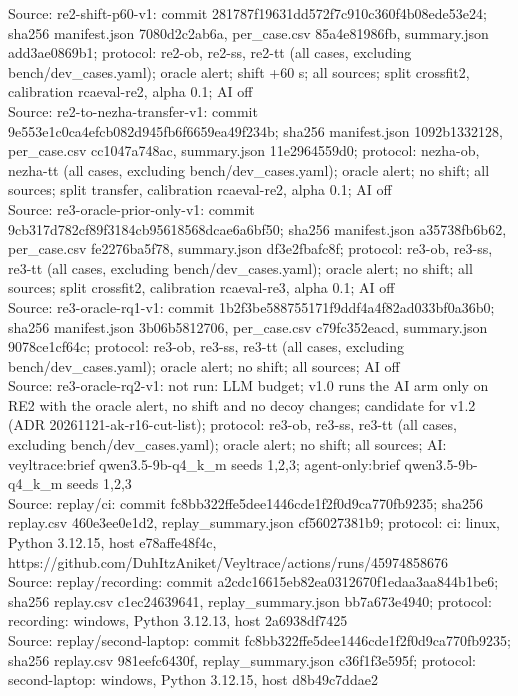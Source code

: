 \begin{table}[t]
Source: re2-shift-p60-v1: commit 281787f19631dd572f7c910c360f4b08ede53e24; sha256 manifest.json 7080d2c2ab6a, per\_case.csv 85a4e81986fb, summary.json add3ae0869b1; protocol: re2-ob, re2-ss, re2-tt (all cases, excluding bench/dev\_cases.yaml); oracle alert; shift +60 s; all sources; split crossfit2, calibration rcaeval-re2, alpha 0.1; AI off\\
Source: re2-to-nezha-transfer-v1: commit 9e553e1c0ca4efcb082d945fb6f6659ea49f234b; sha256 manifest.json 1092b1332128, per\_case.csv cc1047a748ac, summary.json 11e2964559d0; protocol: nezha-ob, nezha-tt (all cases, excluding bench/dev\_cases.yaml); oracle alert; no shift; all sources; split transfer, calibration rcaeval-re2, alpha 0.1; AI off\\
Source: re3-oracle-prior-only-v1: commit 9cb317d782cf89f3184cb95618568dcae6a6bf50; sha256 manifest.json a35738fb6b62, per\_case.csv fe2276ba5f78, summary.json df3e2fbafc8f; protocol: re3-ob, re3-ss, re3-tt (all cases, excluding bench/dev\_cases.yaml); oracle alert; no shift; all sources; split crossfit2, calibration rcaeval-re3, alpha 0.1; AI off\\
Source: re3-oracle-rq1-v1: commit 1b2f3be588755171f9ddf4a4f82ad033bf0a36b0; sha256 manifest.json 3b06b5812706, per\_case.csv c79fc352eacd, summary.json 9078ce1cf64c; protocol: re3-ob, re3-ss, re3-tt (all cases, excluding bench/dev\_cases.yaml); oracle alert; no shift; all sources; AI off\\
Source: re3-oracle-rq2-v1: not run: LLM budget; v1.0 runs the AI arm only on RE2 with the oracle alert, no shift and no decoy changes; candidate for v1.2 (ADR 20261121-ak-r16-cut-list); protocol: re3-ob, re3-ss, re3-tt (all cases, excluding bench/dev\_cases.yaml); oracle alert; no shift; all sources; AI: veyltrace:brief qwen3.5-9b-q4\_k\_m seeds 1,2,3; agent-only:brief qwen3.5-9b-q4\_k\_m seeds 1,2,3\\
Source: replay/ci: commit fc8bb322ffe5dee1446cde1f2f0d9ca770fb9235; sha256 replay.csv 460e3ee0e1d2, replay\_summary.json cf56027381b9; protocol: ci: linux, Python 3.12.15, host e78affe48f4c, https://github.com/DuhItzAniket/Veyltrace/actions/runs/45974858676\\
Source: replay/recording: commit a2cdc16615eb82ea0312670f1edaa3aa844b1be6; sha256 replay.csv c1ec24639641, replay\_summary.json bb7a673e4940; protocol: recording: windows, Python 3.12.13, host 2a6938df7425\\
Source: replay/second-laptop: commit fc8bb322ffe5dee1446cde1f2f0d9ca770fb9235; sha256 replay.csv 981eefc6430f, replay\_summary.json c36f1f3e595f; protocol: second-laptop: windows, Python 3.12.15, host d8b49c7ddae2\\

\end{table}

